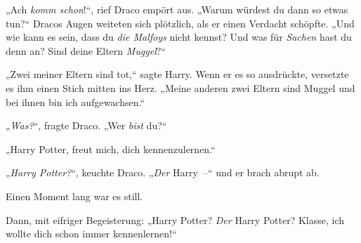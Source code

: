 „Ach \emph{komm schon}!“, rief Draco empört aus. „Warum würdest du dann so etwas tun?“ Dracos Augen weiteten sich plötzlich, als er einen Verdacht schöpfte. „Und wie kann es sein, dass du \emph{die Malfoys} nicht kennst? Und was für \emph{Sachen} hast du denn an? Sind deine Eltern \emph{Muggel}?“

„Zwei meiner Eltern sind tot,“ sagte Harry. Wenn er es so ausdrückte, versetzte es ihm einen Stich mitten ins Herz. „Meine anderen zwei Eltern sind Muggel und bei ihnen bin ich aufgewachsen.“

„\emph{Was?}“, fragte Draco. „Wer \emph{bist} du?“

„Harry Potter, freut mich, dich kennenzulernen.“

„\emph{Harry Potter?}“, keuchte Draco. „\emph{Der} Harry –“ und er brach abrupt ab.

Einen Moment lang war es still.

Dann, mit eifriger Begeisterung: „Harry Potter? \emph{Der} Harry Potter? Klasse, ich wollte dich schon immer kennenlernen!“

